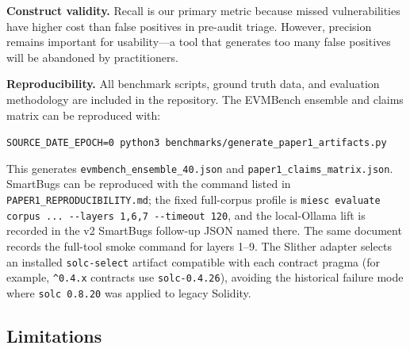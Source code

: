 \documentclass[conference]{IEEEtran}
\begin{document}
\textbf{Construct validity.} Recall is our primary metric because missed vulnerabilities have higher cost than false positives in pre-audit triage. However, precision remains important for usability---a tool that generates too many false positives will be abandoned by practitioners.

\textbf{Reproducibility.} All benchmark scripts, ground truth data, and evaluation methodology are included in the repository. The EVMBench ensemble and claims matrix can be reproduced with:

\smallskip
\noindent\texttt{SOURCE\_DATE\_EPOCH=0 python3 benchmarks/generate\_paper1\_artifacts.py}
\smallskip

This generates \texttt{evmbench\_ensemble\_40.json} and \texttt{paper1\_claims\_matrix.json}. SmartBugs can be reproduced with the command listed in \texttt{PAPER1\_REPRODUCIBILITY.md}; the fixed full-corpus profile is \texttt{miesc evaluate corpus ... -{}-layers 1,6,7 -{}-timeout 120}, and the local-Ollama lift is recorded in the v2 SmartBugs follow-up JSON named there. The same document records the full-tool smoke command for layers 1--9. The Slither adapter selects an installed \texttt{solc-select} artifact compatible with each contract pragma (for example, \texttt{\^{}0.4.x} contracts use \texttt{solc-0.4.26}), avoiding the historical failure mode where \texttt{solc 0.8.20} was applied to legacy Solidity.

\subsection{Limitations}
\end{document}
